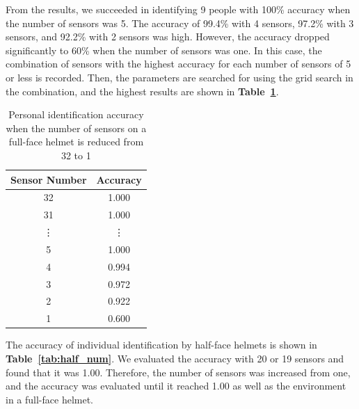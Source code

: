 \documentclass[sigchi,authordraft]{acmart}
\newcommand\tabref[1]{\textbf{Table~\ref{tab:#1}}}
\begin{document}
From the results, we succeeded in identifying 9 people with 100\% accuracy when the number of sensors was 5. The accuracy of 99.4\% with 4 sensors, 97.2\% with 3 sensors, and 92.2\% with 2 sensors was high. However, the accuracy dropped significantly to 60\% when the number of sensors was one. In this case, the combination of sensors with the highest accuracy for each number of sensors of 5 or less is recorded. Then, the parameters are searched for using the grid search in the combination, and the highest results are shown in \tabref{full_num}.\par


\begin{table}[!t]
  \centering
  \caption{Personal identification accuracy when the number of sensors on a full-face helmet is reduced from 32 to 1}
  \begin{tabular}{c|c} \hline\hline
    Sensor Number & Accuracy \\ \hline
    32 & 1.000 \\
    31 & 1.000 \\
    \vdots & \vdots \\
    5 & 1.000 \\
    4 & 0.994 \\
    3 & 0.972 \\
    2 & 0.922 \\
    1 & 0.600 \\ \hline
  \end{tabular}
  \label{tab:full_num}
\end{table}

The accuracy of individual identification by half-face helmets is shown in \tabref{half_num}. We evaluated the accuracy with 20 or 19 sensors and found that it was 1.00. Therefore, the number of sensors was increased from one, and the accuracy was evaluated until it reached 1.00 as well as the environment in a full-face helmet.\par

\end{document}
